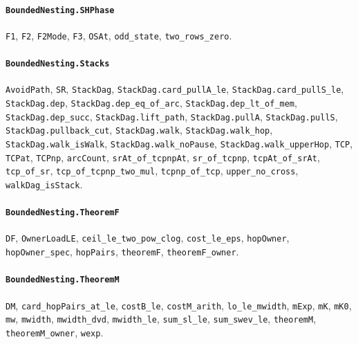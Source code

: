 \paragraph{\texttt{BoundedNesting.SHPhase}}
{\small\raggedright \texttt{F1}, \texttt{F2}, \texttt{F2Mode}, \texttt{F3}, \texttt{OSAt}, \texttt{odd\_state}, \texttt{two\_rows\_zero}.\par}

\paragraph{\texttt{BoundedNesting.Stacks}}
{\small\raggedright \texttt{AvoidPath}, \texttt{SR}, \texttt{StackDag}, \texttt{StackDag.card\_pullA\_le}, \texttt{StackDag.card\_pullS\_le}, \texttt{StackDag.dep}, \texttt{StackDag.dep\_eq\_of\_arc}, \texttt{StackDag.dep\_lt\_of\_mem}, \texttt{StackDag.dep\_succ}, \texttt{StackDag.lift\_path}, \texttt{StackDag.pullA}, \texttt{StackDag.pullS}, \texttt{StackDag.pullback\_cut}, \texttt{StackDag.walk}, \texttt{StackDag.walk\_hop}, \texttt{StackDag.walk\_isWalk}, \texttt{StackDag.walk\_noPause}, \texttt{StackDag.walk\_upperHop}, \texttt{TCP}, \texttt{TCPat}, \texttt{TCPnp}, \texttt{arcCount}, \texttt{srAt\_of\_tcpnpAt}, \texttt{sr\_of\_tcpnp}, \texttt{tcpAt\_of\_srAt}, \texttt{tcp\_of\_sr}, \texttt{tcp\_of\_tcpnp\_two\_mul}, \texttt{tcpnp\_of\_tcp}, \texttt{upper\_no\_cross}, \texttt{walkDag\_isStack}.\par}

\paragraph{\texttt{BoundedNesting.TheoremF}}
{\small\raggedright \texttt{DF}, \texttt{OwnerLoadLE}, \texttt{ceil\_le\_two\_pow\_clog}, \texttt{cost\_le\_eps}, \texttt{hopOwner}, \texttt{hopOwner\_spec}, \texttt{hopPairs}, \texttt{theoremF}, \texttt{theoremF\_owner}.\par}

\paragraph{\texttt{BoundedNesting.TheoremM}}
{\small\raggedright \texttt{DM}, \texttt{card\_hopPairs\_at\_le}, \texttt{costB\_le}, \texttt{costM\_arith}, \texttt{lo\_le\_mwidth}, \texttt{mExp}, \texttt{mK}, \texttt{mK0}, \texttt{mw}, \texttt{mwidth}, \texttt{mwidth\_dvd}, \texttt{mwidth\_le}, \texttt{sum\_sl\_le}, \texttt{sum\_swev\_le}, \texttt{theoremM}, \texttt{theoremM\_owner}, \texttt{wexp}.\par}

